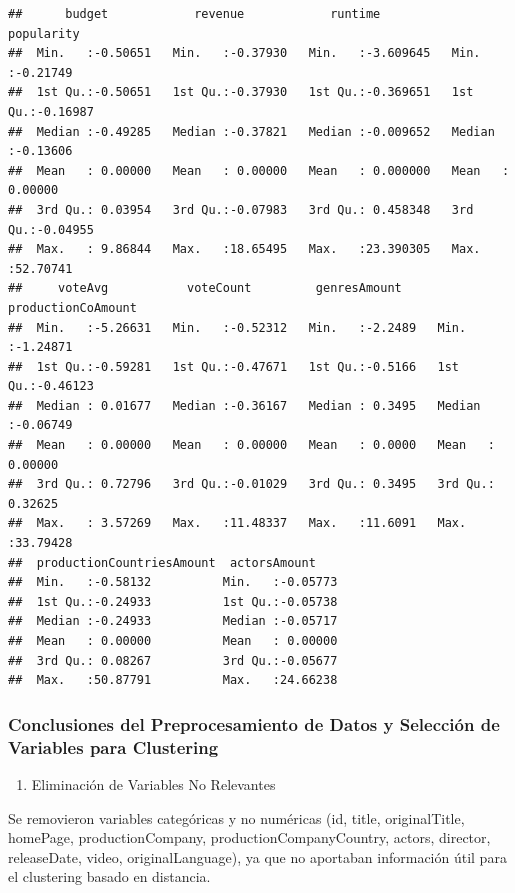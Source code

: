 \documentclass[
]{article}
\providecommand{\tightlist}{%
  \setlength{\itemsep}{0pt}\setlength{\parskip}{0pt}}
\begin{document}
\begin{verbatim}
##      budget            revenue            runtime            popularity      
##  Min.   :-0.50651   Min.   :-0.37930   Min.   :-3.609645   Min.   :-0.21749  
##  1st Qu.:-0.50651   1st Qu.:-0.37930   1st Qu.:-0.369651   1st Qu.:-0.16987  
##  Median :-0.49285   Median :-0.37821   Median :-0.009652   Median :-0.13606  
##  Mean   : 0.00000   Mean   : 0.00000   Mean   : 0.000000   Mean   : 0.00000  
##  3rd Qu.: 0.03954   3rd Qu.:-0.07983   3rd Qu.: 0.458348   3rd Qu.:-0.04955  
##  Max.   : 9.86844   Max.   :18.65495   Max.   :23.390305   Max.   :52.70741  
##     voteAvg           voteCount         genresAmount     productionCoAmount
##  Min.   :-5.26631   Min.   :-0.52312   Min.   :-2.2489   Min.   :-1.24871  
##  1st Qu.:-0.59281   1st Qu.:-0.47671   1st Qu.:-0.5166   1st Qu.:-0.46123  
##  Median : 0.01677   Median :-0.36167   Median : 0.3495   Median :-0.06749  
##  Mean   : 0.00000   Mean   : 0.00000   Mean   : 0.0000   Mean   : 0.00000  
##  3rd Qu.: 0.72796   3rd Qu.:-0.01029   3rd Qu.: 0.3495   3rd Qu.: 0.32625  
##  Max.   : 3.57269   Max.   :11.48337   Max.   :11.6091   Max.   :33.79428  
##  productionCountriesAmount  actorsAmount     
##  Min.   :-0.58132          Min.   :-0.05773  
##  1st Qu.:-0.24933          1st Qu.:-0.05738  
##  Median :-0.24933          Median :-0.05717  
##  Mean   : 0.00000          Mean   : 0.00000  
##  3rd Qu.: 0.08267          3rd Qu.:-0.05677  
##  Max.   :50.87791          Max.   :24.66238
\end{verbatim}

\subsubsection{Conclusiones del Preprocesamiento de Datos y Selección de
Variables para
Clustering}\label{conclusiones-del-preprocesamiento-de-datos-y-selecciuxf3n-de-variables-para-clustering}

\begin{enumerate}
\def\labelenumi{\arabic{enumi}.}
\tightlist
\item
  Eliminación de Variables No Relevantes
\end{enumerate}

Se removieron variables categóricas y no numéricas (id, title,
originalTitle, homePage, productionCompany, productionCompanyCountry,
actors, director, releaseDate, video, originalLanguage), ya que no
aportaban información útil para el clustering basado en distancia.
\end{document}
